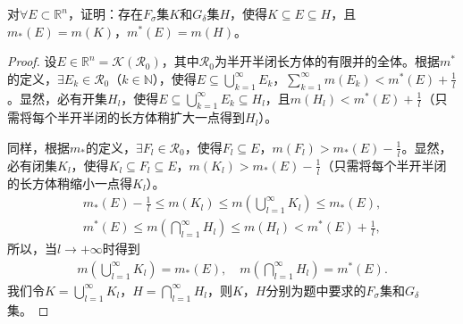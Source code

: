 \documentclass[../../main.tex]{subfiles}%
\begin{document}
\begin{proposition}
对$\forall E\subset\mathbb{R}^n$，证明：存在$F_\sigma$集$K$和$G_\delta$集$H$，使得$K\subseteq E\subseteq H$，且$m_*(E)=m(K)$，$m^*(E)=m(H)$。
\end{proposition}
\begin{proof}
设$E\in\mathbb{R}^n=\mathscr{K}(\mathscr{R}_0)$，其中$\mathscr{R}_0$为半开半闭长方体的有限并的全体。根据$m^*$的定义，$\exists E_k\in\mathscr{R}_0$（$k\in\mathbb{N}$），使得$E\subseteq\bigcup\limits_{k=1}^{\infty}E_k$，$\sum\limits_{k=1}^{\infty}m(E_k)<m^*(E)+\frac{1}{l}$。显然，必有开集$H_l$，使得$E\subseteq\bigcup\limits_{k=1}^{\infty}E_k\subseteq H_l$，且$m(H_l)<m^*(E)+\frac{1}{l}$（只需将每个半开半闭的长方体稍扩大一点得到$H_l$）。

同样，根据$m_*$的定义，$\exists F_l\in\mathscr{R}_0$，使得$F_l\subseteq E$，$m(F_l)>m_*(E)-\frac{1}{l}$。显然，必有闭集$K_l$，使得$K_l\subseteq F_l\subseteq E$，$m(K_l)>m_*(E)-\frac{1}{l}$（只需将每个半开半闭的长方体稍缩小一点得$K_l$）。
\begin{gather*}
m_*(E)-\frac{1}{l} \leqslant m(K_l)\leqslant m\left(\bigcup\limits_{l=1}^{\infty}K_l\right)\leqslant m_*(E), \\
m^*(E) \leqslant m\left(\bigcap\limits_{l=1}^{\infty}H_l\right)\leqslant m(H_l)<m^*(E)+\frac{1}{l},
\end{gather*}
所以，当$l\to+\infty$时得到
\begin{align*}
m\left(\bigcup\limits_{l=1}^{\infty}K_l\right) = m_*(E),\quad m\left(\bigcap\limits_{l=1}^{\infty}H_l\right) = m^*(E).
\end{align*}
我们令$K=\bigcup\limits_{l=1}^{\infty}K_l$，$H=\bigcap\limits_{l=1}^{\infty}H_l$，则$K$，$H$分别为题中要求的$F_\sigma$集和$G_\delta$集。
\end{proof}
\end{document}
